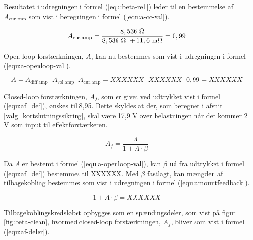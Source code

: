 Resultatet i udregningen i formel (\ref{equ:beta-re1}) leder til en bestemmelse af $A_\mathrm{cur.amp}$ som vist i beregningen i formel (\ref{equ:a-cc-val}).

\begin{equation}
\label{equ:a-cc-val}
A_\mathrm{cur.amp} = \frac{\mathrm{8,536~\ohm}}{\mathrm{8,536~\ohm~} + \mathrm{11,6~m\ohm}} = 0,99
\end{equation}

Open-loop forstærkningen, $A$, kan nu bestemmes som vist i udregningen i formel (\ref{equ:a-openloop-val}).

\begin{equation}
\label{equ:a-openloop-val}
A = A_\mathrm{diff.amp} \cdot A_\mathrm{vol.amp} \cdot A_\mathrm{cur.amp} = XXXXXX \cdot XXXXXX \cdot 0,99 = XXXXXX
\end{equation}

Closed-loop forstærkningen, $A_f$, som er givet ved udtrykket vist i formel (\ref{equ:af_def}), ønskes til 8,95. Dette skyldes at der, som beregnet i afsnit \ref{valg_kortslutningssikring}, skal være 17,9 V over belastningen når der kommer 2 V som input til effektforstærkeren.

\begin{equation}
\label{equ:af_def}
A_f = \frac{A}{1 + A \cdot \beta}
\end{equation}

Da $A$ er bestemt i formel (\ref{equ:a-openloop-val}), kan $\beta$ ud fra udtrykket i formel (\ref{equ:af_def}) bestemmes til XXXXXX. Med $\beta$ fastlagt, kan mængden af tilbagekobling bestemmes som vist i udregningen i formel (\ref{equ:amountfeedback}).

\begin{equation}
\label{equ:amountfeedback}
1 + A \cdot \beta = XXXXXX
\end{equation}

Tilbagekoblingskredsløbet opbygges som en spændingsdeler, som vist på figur \ref{fig:beta-clean}, hvormed closed-loop forstærkningen, $A_f$, bliver som vist i formel (\ref{equ:af-deler}).

